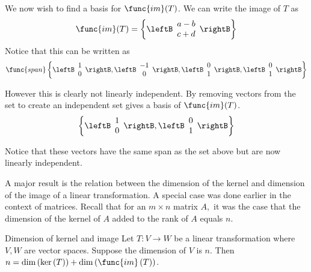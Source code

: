 \begin{solution}
We now wish to find a basis for $\func{im}(T)$. We can write the image of $T$ as 
\[
\func{im}(T) = \left\{ 
\leftB \begin{array}{c}
a - b  \\
c + d  
\end{array}
\rightB
\right\}
\]
Notice that this can be written as 
\[
\func{span}
\left\{
\leftB \begin{array}{c}
1 \\ 
0
\end{array}\rightB, 
\leftB \begin{array}{c}
-1 \\ 
0
\end{array}\rightB, 
\leftB \begin{array}{c}
0 \\ 
1
\end{array}\rightB, 
\leftB \begin{array}{c}
0 \\ 
1
\end{array}\rightB \right\}
\]

However this is clearly not linearly independent. By removing vectors from the set to create an independent set gives a basis of $\func{im}(T)$.
\[
\left\{
\leftB \begin{array}{c}
1 \\ 
0
\end{array}\rightB, 
\leftB \begin{array}{c}
0 \\ 
1
\end{array}\rightB
\right\}
\]

Notice that these vectors have the same span as the set above but are now linearly independent.
\end{solution}

A major result is the relation between the dimension of the kernel and
dimension of the image of a linear transformation. A special case was done
earlier in the context of matrices. Recall that for an $m\times n$ matrix $%
A, $ it was the case that the dimension of the kernel of $A$ added to the
rank of $A$ equals $n$. 

\begin{theorem}{Dimension of kernel and image}{}
Let $T:V\rightarrow W$ be a linear transformation where $V,W$ are vector
spaces. Suppose the dimension of $V$ is $n$.
Then $n=\dim \left( \ker \left( T\right) \right) +\dim \left( \func{im}
\left( T\right) \right) $.
\end{theorem}

